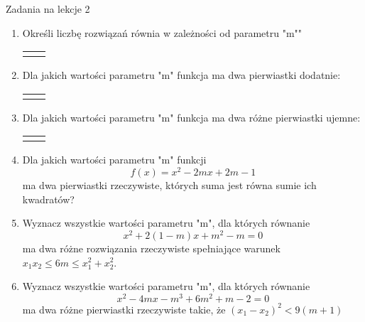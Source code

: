 \documentclass[12pt,a4paper]{article}
\begin{document}
	
	\begin{center}
		\LARGE Zadania na lekcje 2
	\end{center}
	\vspace{1.5cm}
	
	\begin{enumerate}[1.]
		\item Określi liczbę rozwiązań równia w zależności od parametru "m""
		\begin{enumerate}[a)] \begin{tabular}{p{7cm} p{7cm}} 
				\item $(m-3)x^2+(m-2)x+1=0$& \vspace{0.4cm} 	\item $(2m-3)x^2+4mx+m-1=0$ \\
		\end{tabular} \end{enumerate}
	
		\item Dla jakich wartości parametru "m" funkcja ma dwa pierwiastki dodatnie:
		\begin{enumerate}[a)] \begin{tabular}{p{7cm} p{7cm}} 
				\item $f(x)=x^2+2(m-1)x+2m+1$& \vspace{0.4cm} 	\item $f(x)=x^2+(m-5)x+m-2$ \\
		\end{tabular} \end{enumerate}
	
		\item Dla jakich wartości parametru "m" funkcja ma dwa różne pierwiastki ujemne:
		\begin{enumerate}[a)] \begin{tabular}{p{7cm} p{7cm}} 
				\item $f(x)=x^2+5mx+4m^2-3m$& \vspace{0.4cm} 	\item $f(x)=(m-2)x^2-2mx+m^2-3m+4$ \\
		\end{tabular} \end{enumerate}
	
		\item Dla jakich wartości parametru "m" funkcji
		$$f(x)=x^2-2mx+2m-1$$
		ma dwa pierwiastki rzeczywiste, których suma jest równa sumie ich kwadratów?
		
		\item Wyznacz wszystkie wartości parametru "m", dla których równanie
		$$x^2+2(1-m)x+m^2-m=0$$
		ma dwa różne rozwiązania rzeczywiste spełniające warunek $x_1x_2\leq 6m \leq x_1^2+x_2^2 $.
		
		\item Wyznacz wszystkie wartości parametru "m", dla których równanie
		$$x^2-4mx-m^3+6m^2+m-2=0$$
		ma dwa różne pierwiastki rzeczywiste takie, że $(x_1-x_2)^2<9(m+1)$
	\end{enumerate}
	
\end{document}
